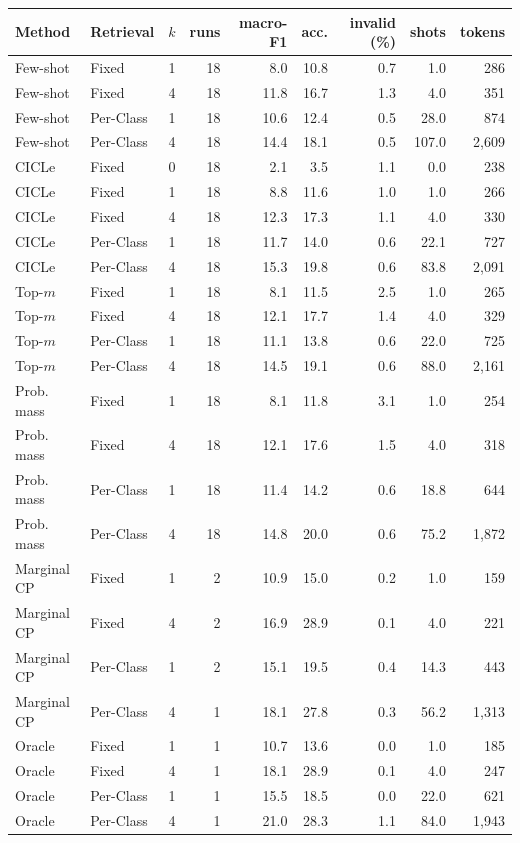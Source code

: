 \begin{tabular}{llrrrrrrr}
\toprule
Method & Retrieval & $k$ & runs & macro-F1 & acc. & invalid (\%) & shots & tokens \\
\midrule
Few-shot & Fixed & 1 & 18 & 8.0 & 10.8 & 0.7 & 1.0 & 286 \\
Few-shot & Fixed & 4 & 18 & 11.8 & 16.7 & 1.3 & 4.0 & 351 \\
Few-shot & Per-Class & 1 & 18 & 10.6 & 12.4 & 0.5 & 28.0 & 874 \\
Few-shot & Per-Class & 4 & 18 & 14.4 & 18.1 & 0.5 & 107.0 & 2,609 \\
CICLe & Fixed & 0 & 18 & 2.1 & 3.5 & 1.1 & 0.0 & 238 \\
CICLe & Fixed & 1 & 18 & 8.8 & 11.6 & 1.0 & 1.0 & 266 \\
CICLe & Fixed & 4 & 18 & 12.3 & 17.3 & 1.1 & 4.0 & 330 \\
CICLe & Per-Class & 1 & 18 & 11.7 & 14.0 & 0.6 & 22.1 & 727 \\
CICLe & Per-Class & 4 & 18 & 15.3 & 19.8 & 0.6 & 83.8 & 2,091 \\
\midrule
Top-$m$ & Fixed & 1 & 18 & 8.1 & 11.5 & 2.5 & 1.0 & 265 \\
Top-$m$ & Fixed & 4 & 18 & 12.1 & 17.7 & 1.4 & 4.0 & 329 \\
Top-$m$ & Per-Class & 1 & 18 & 11.1 & 13.8 & 0.6 & 22.0 & 725 \\
Top-$m$ & Per-Class & 4 & 18 & 14.5 & 19.1 & 0.6 & 88.0 & 2,161 \\
Prob. mass & Fixed & 1 & 18 & 8.1 & 11.8 & 3.1 & 1.0 & 254 \\
Prob. mass & Fixed & 4 & 18 & 12.1 & 17.6 & 1.5 & 4.0 & 318 \\
Prob. mass & Per-Class & 1 & 18 & 11.4 & 14.2 & 0.6 & 18.8 & 644 \\
Prob. mass & Per-Class & 4 & 18 & 14.8 & 20.0 & 0.6 & 75.2 & 1,872 \\
Marginal CP & Fixed & 1 & 2 & 10.9 & 15.0 & 0.2 & 1.0 & 159 \\
Marginal CP & Fixed & 4 & 2 & 16.9 & 28.9 & 0.1 & 4.0 & 221 \\
Marginal CP & Per-Class & 1 & 2 & 15.1 & 19.5 & 0.4 & 14.3 & 443 \\
Marginal CP & Per-Class & 4 & 1 & 18.1 & 27.8 & 0.3 & 56.2 & 1,313 \\
Oracle & Fixed & 1 & 1 & 10.7 & 13.6 & 0.0 & 1.0 & 185 \\
Oracle & Fixed & 4 & 1 & 18.1 & 28.9 & 0.1 & 4.0 & 247 \\
Oracle & Per-Class & 1 & 1 & 15.5 & 18.5 & 0.0 & 22.0 & 621 \\
Oracle & Per-Class & 4 & 1 & 21.0 & 28.3 & 1.1 & 84.0 & 1,943 \\
\bottomrule
\end{tabular}
